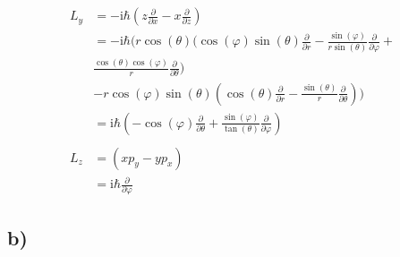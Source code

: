\begin{align*}
    \\
    L_y &= -\text{i} \hbar(z\frac{\partial}{\partial x}-x\frac{\partial}{\partial z})\\
    &= -\text{i} \hbar (r\cos(\theta)
    (\cos(\varphi)\sin(\theta)\frac{\partial}{\partial r} - \frac{\sin(\varphi)}{r\sin(\theta)}\frac{\partial}{\partial \varphi} +\\
    & \frac{\cos(\theta)\cos(\varphi)}{r}\frac{\partial}{\partial \theta})\\
    &-r\cos(\varphi)\sin(\theta) 
    \left(\cos(\theta)\frac{\partial}{\partial r} - \frac{\sin(\theta)}{r}\frac{\partial}{\partial \theta}\right) )\\
    &= \text{i}\hbar\left( -\cos(\varphi)\frac{\partial}{\partial \theta} + \frac{\sin(\varphi)}{\tan(\theta)}\frac{\partial}{\partial \varphi} \right)\\
    \\
    L_z &= (xp_y-yp_x)\\
    &= \text{i}\hbar\frac{\partial}{\partial \varphi}
    \end{align*}


    \subsection{b)}


